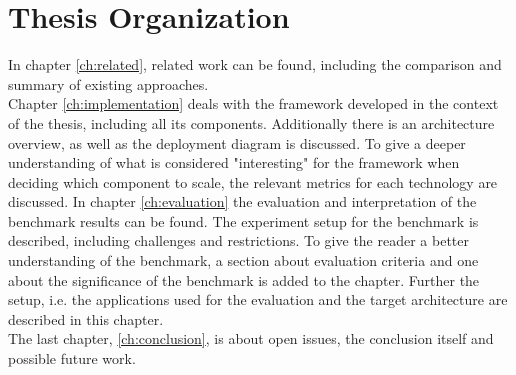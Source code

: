 \section{Thesis Organization}
In chapter \ref{ch:related}, related work can be found, including the comparison and summary of existing approaches.\\
Chapter \ref{ch:implementation} deals with the framework developed in the context of the thesis, including all its components.
Additionally there is an architecture overview, as well as the deployment diagram is discussed.
To give a deeper understanding of what is considered "interesting" for the framework when deciding which component to scale, the relevant metrics for each technology are discussed.
In chapter \ref{ch:evaluation} the evaluation and interpretation of the benchmark results can be found.
The experiment setup for the benchmark is described, including challenges and restrictions.
To give the reader a better understanding of the benchmark, a section about evaluation criteria and one about the significance of the benchmark is added to the chapter.
Further the setup, i.e. the applications used for the evaluation and the target architecture are described in this chapter.\\
The last chapter, \ref{ch:conclusion}, is about open issues, the conclusion itself and possible future work.

